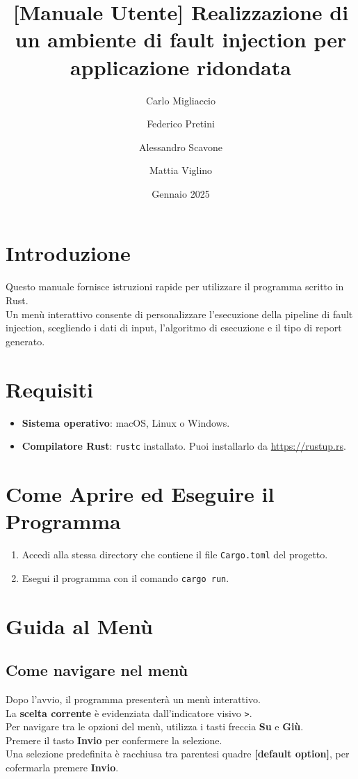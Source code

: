 \documentclass{article}
\title{\textbf{[Manuale Utente] Realizzazione di un ambiente di fault injection per applicazione ridondata}}
\author{Carlo Migliaccio}
\author{Federico Pretini}
\author{Alessandro Scavone}
\author{Mattia Viglino}
\affil[1]{\small{Laurea Magistrale in Ingegneria Informatica, Politecnico di Torino}}
\date{Gennaio 2025}
\begin{document}
\renewcommand{\labelenumii}{\arabic{enumi}.\arabic{enumii}}

\maketitle
\thispagestyle{empty}
\vspace{-0.8cm}
\tableofcontents

\section*{Introduzione}
Questo manuale fornisce istruzioni rapide per utilizzare il programma scritto in Rust. \\
Un menù interattivo consente di personalizzare l'esecuzione della pipeline di fault injection, scegliendo i dati di input, l'algoritmo di esecuzione e il tipo di report generato.

\section*{Requisiti}
\begin{itemize}
\item \textbf{Sistema operativo}: macOS, Linux o Windows.
\item \textbf{Compilatore Rust}: \texttt{rustc} installato. Puoi installarlo da \url{https://rustup.rs}.
\end{itemize}

\section*{Come Aprire ed Eseguire il Programma}
\begin{enumerate}
\item Accedi alla stessa directory che contiene il file \texttt{Cargo.toml} del progetto.
\item Esegui il programma con il comando \texttt{cargo run}.
\end{enumerate}

\section*{Guida al Menù}
\subsection{Come navigare nel menù}
Dopo l'avvio, il programma presenterà un menù interattivo.\\
La \textbf{scelta corrente} è evidenziata dall'indicatore visivo \texttt{>}.\\
Per navigare tra le opzioni del menù, utilizza i tasti freccia \textbf{Su} e \textbf{Giù}.\\
Premere il tasto \textbf{Invio} per confermere la selezione. \\ 
Una selezione predefinita è racchiusa tra parentesi quadre \textbf{[default option]}, per cofermarla premere \textbf{Invio}.
\end{document}
